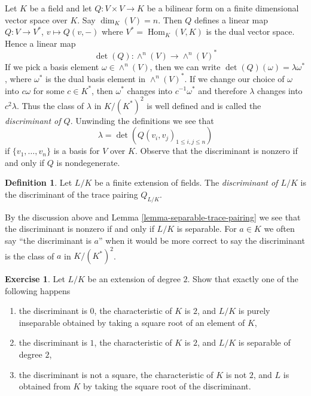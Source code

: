 \documentclass{stacks-project}
\theoremstyle{plain}
\theoremstyle{definition}
\newtheorem{definition}[subsection]{Definition}
\newtheorem{exercise}[subsection]{Exercise}
\theoremstyle{remark}
\numberwithin{equation}{subsection}
\def\Hom{\mathop{\mathrm{Hom}}\nolimits}
\begin{document}
\noindent
Let $K$ be a field and let $Q : V \times V \to K$ be a bilinear form
on a finite dimensional vector space over $K$. Say $\dim_K(V) = n$.
Then $Q$ defines a linear map $Q : V \to V^*$, $v \mapsto Q(v, -)$
where $V^* = \Hom_K(V, K)$ is the dual vector space. Hence a linear map
$$
\det(Q) : \wedge^n(V) \longrightarrow \wedge^n(V)^*
$$
If we pick a basis element $\omega \in \wedge^n(V)$, then we can
write $\det(Q)(\omega) = \lambda \omega^*$, where $\omega^*$
is the dual basis element in $\wedge^n(V)^*$. If we change our
choice of $\omega$ into $c \omega$ for some $c \in K^*$, then
$\omega^*$ changes into $c^{-1} \omega^*$ and therefore
$\lambda$ changes into $c^2 \lambda$. Thus the class of
$\lambda$ in $K/(K^*)^2$ is well defined and is called the
{\it discriminant of $Q$}. Unwinding the definitions we see that
$$
\lambda = \det(Q(v_i, v_j)_{1 \leq i, j \leq n})
$$
if $\{v_1, \ldots, v_n\}$ is a basis for $V$ over $K$. Observe that
the discriminant is nonzero if and only if $Q$ is nondegenerate.

\begin{definition}
\label{definition-discriminant}
Let $L/K$ be a finite extension of fields. The
{\it discriminant of $L/K$} is the discriminant of
the trace pairing $Q_{L/K}$.
\end{definition}

\noindent
By the discussion above and Lemma \ref{lemma-separable-trace-pairing}
we see that the discriminant is nonzero if and only
if $L/K$ is separable. For $a \in K$ we often say
``the discriminant is $a$'' when it would be more correct
to say the discriminant is the class of $a$ in $K/(K^*)^2$.

\begin{exercise}
\label{exercise-quadratic-discriminant}
Let $L/K$ be an extension of degree $2$. Show that exactly
one of the following happens
\begin{enumerate}
\item the discriminant is $0$, the characteristic of $K$ is $2$,
and $L/K$ is purely inseparable obtained by taking a square root
of an element of $K$,
\item the discriminant is $1$, the characteristic of $K$ is $2$, and
$L/K$ is separable of degree $2$,
\item the discriminant is not a square, the characteristic of $K$
is not $2$, and $L$ is obtained from $K$ by taking the square root
of the discriminant.
\end{enumerate}
\end{exercise}
\end{document}
